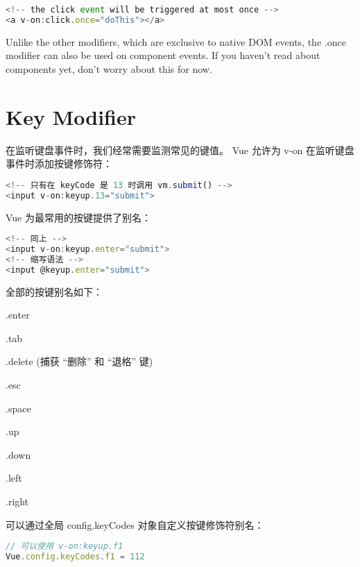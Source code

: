 \begin{lstlisting}[language=JavaScript]
<!-- the click event will be triggered at most once -->
<a v-on:click.once="doThis"></a>
\end{lstlisting}




Unlike the other modifiers, which are exclusive to native DOM events, the .once modifier can also be used on component events. If you haven’t read about components yet, don’t worry about this for now.








\section{Key Modifier}



在监听键盘事件时，我们经常需要监测常见的键值。 Vue 允许为 v-on 在监听键盘事件时添加按键修饰符：



\begin{lstlisting}[language=JavaScript]
<!-- 只有在 keyCode 是 13 时调用 vm.submit() -->
<input v-on:keyup.13="submit">
\end{lstlisting}

 Vue 为最常用的按键提供了别名：

\begin{lstlisting}[language=JavaScript]
<!-- 同上 -->
<input v-on:keyup.enter="submit">
<!-- 缩写语法 -->
<input @keyup.enter="submit">
\end{lstlisting}

全部的按键别名如下：

\begin{compactitem}
\item .enter
\item .tab
\item .delete (捕获 “删除” 和 “退格” 键)
\item .esc
\item .space
\item .up
\item .down
\item .left
\item .right
\end{compactitem}

可以通过全局 config.keyCodes 对象自定义按键修饰符别名：

\begin{lstlisting}[language=JavaScript]
// 可以使用 v-on:keyup.f1
Vue.config.keyCodes.f1 = 112
\end{lstlisting}







